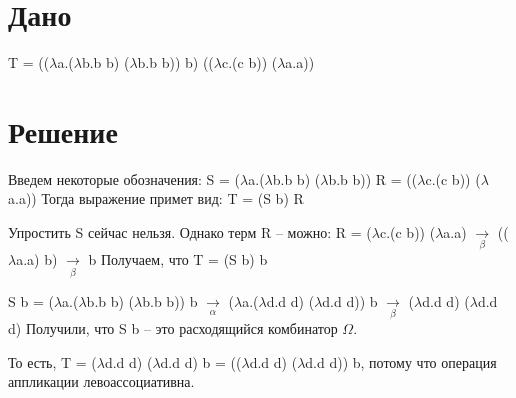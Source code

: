 \documentclass[a4paper,14pt]{article}
\begin{document}
\fontsize{16}{22pt}\selectfont
{} 
\bigskip

\section*{Дано}
T = (($\lambda$a.($\lambda$b.b b) ($\lambda$b.b b)) b) (($\lambda$c.(c b)) ($\lambda$a.a))

\section*{Решение}
Введем некоторые обозначения: \newline
S = ($\lambda$a.($\lambda$b.b b) ($\lambda$b.b b)) \newline
R = (($\lambda$c.(c b)) ($\lambda$a.a)) \newline
Тогда  выражение примет вид: T = (S b) R \newline

Упростить S сейчас нельзя. \newline
Однако терм R -- можно: \newline
R = ($\lambda$c.(c b)) ($\lambda$a.a)
    $\xrightarrow[\beta]{}$ (($\lambda$a.a) b) $\xrightarrow[\beta]{}$ b \newline
Получаем, что T = (S b) b


S b = ($\lambda$a.($\lambda$b.b b) ($\lambda$b.b b)) b $\xrightarrow[\alpha]{}$ \newline
        ($\lambda$a.($\lambda$d.d d) ($\lambda$d.d d)) b $\xrightarrow[\beta]{}$ 
        ($\lambda$d.d d) ($\lambda$d.d d) \newline
Получили, что S b -- это расходящийся комбинатор $\Omega$. \newline

То есть, T = ($\lambda$d.d d) ($\lambda$d.d d) b = \newline
(($\lambda$d.d d) ($\lambda$d.d d)) b, потому что операция аппликации левоассоциативна.
        
        
\end{document}
